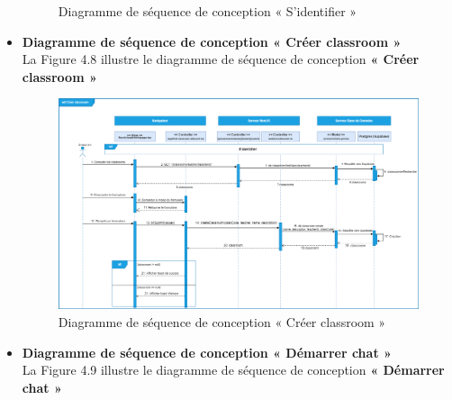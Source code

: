 \begin{itemize}[itemsep=1pt, parsep=1pt]
\begin{figure}[H]
            \caption{Diagramme de séquence de conception « S’identifier »}
            \label{fig:Diagramme de séquence de conception « S’identifier »}    
        \end{figure}
    \item \textbf{Diagramme de séquence de conception « Créer classroom » }\\
        La Figure 4.8 illustre le diagramme de séquence de conception \textbf{« Créer classroom »} 
        \begin{figure}[H]
            \centering
            \includegraphics[width=1.32\textwidth,height=1\textwidth,angle=90]{images/chp4/fig8.png}
            \caption{Diagramme de séquence de conception « Créer classroom »}
            \label{fig:Diagramme de séquence de conception « Créer classroom »}    
        \end{figure}
    \item \textbf{Diagramme de séquence de conception « Démarrer chat »}\\
    La Figure 4.9 illustre le diagramme de séquence de conception \textbf{« Démarrer chat »} 
    \begin{figure}[H]
        \centering

\end{figure}
\end{itemize}
